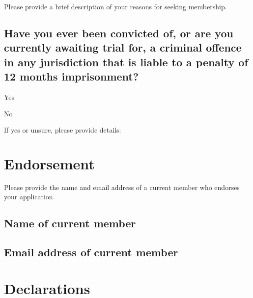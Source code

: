 \documentclass[a4paper,10pt]{article}
\begin{document}
\begin{Form}
Please provide a brief description of your reasons for seeking membership.

\begin{framed}%
  \TextField[width=\textwidth,donotscroll=true,multiline=true,name=reasons]{ }%
\end{framed}%

\subsection{Have you ever been convicted of, or are you currently awaiting trial for, a criminal offence in any jurisdiction that is liable to a penalty of 12 months imprisonment?}

\ChoiceMenu[radio,radiosymbol=\ding{108},name=criminaloffenceradio]{ }{ } Yes

\ChoiceMenu[radio,radiosymbol=\ding{108},name=criminaloffenceradio]{ }{ } No

If yes or unsure, please provide details:

\begin{framed}%
  \TextField[width=\textwidth,donotscroll=true,multiline=true,name=criminaloffence]{ }%
\end{framed}%

\section{Endorsement}

Please provide the name and email address of a current member who endorses your application.

\subsection{Name of current member}

\begin{framed}%
  \TextField[width=\textwidth,donotscroll=true,name=endorsename]{ }%
\end{framed}%

\subsection{Email address of current member}

\begin{framed}%
  \TextField[width=\textwidth,donotscroll=true,name=endorseemail]{ }%
\end{framed}%

\section{Declarations}


\end{Form}
\end{document}
